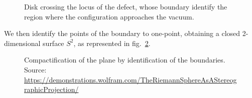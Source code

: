 \documentclass[../main/main.tex]{subfiles}
\begin{document}
\begin{figure}[h]
\caption{Disk crossing the locus of the defect, whose boundary identify the region where the configuration approaches the vacuum.}
\label{fig:disk-defect}
\end{figure}

We then identify the points of the boundary to one-point, obtaining a closed 2-dimensional surface $S^2$, as represented in fig.~\ref{fig:compactification-Riemann-sphere}. 

\begin{figure}[h]
\centering
\def\svgwidth{\columnwidth}
\caption{Compactification of the plane by identification of the boundaries. Source: \url{https://demonstrations.wolfram.com/TheRiemannSphereAsAStereographicProjection/}}
\label{fig:compactification-Riemann-sphere}
\end{figure}
\end{document}
